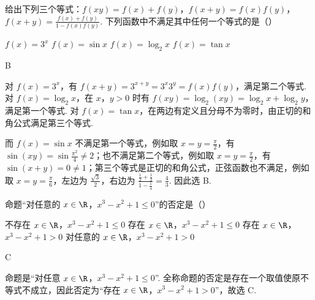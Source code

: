 \begin{problem}
给出下列三个等式：\(f(xy) = f(x) + f(y)\)，\(f(x + y) = f(x)f(y)\)，\(f(x + y) = \frac{f(x) + f(y)}{1 - f(x)f(y)}\). 下列函数中不满足其中任何一个等式的是（\quad）

\choices
    {\(f(x) = 3^{x}\)}
    {\(f(x) = \sin x\)}
    {\(f(x) = \log_2x\)}
    {\(f(x) = \tan x\)}

\begin{answer}B\end{answer}

\begin{solution}
对 \(f(x)=3^x\)，有 \(f(x+y)=3^{x+y}=3^x3^y=f(x)f(y)\)，满足第二个等式. 对 \(f(x)=\log_2x\)，在 \(x\)，\(y>0\) 时有 \(f(xy)=\log_2(xy)=\log_2x+\log_2y\)，满足第一个等式. 对 \(f(x)=\tan x\)，在两边有定义且分母不为零时，由正切的和角公式满足第三个等式.

而 \(f(x)=\sin x\) 不满足第一个等式，例如取 \(x=y=\frac{\pi}{2}\)，有 \(\sin(xy)=\sin\frac{\pi^2}{4}\neq2\)；也不满足第二个等式，例如取 \(x=y=\frac{\pi}{2}\)，有 \(\sin(x+y)=0\neq1\)；第三个等式是正切的和角公式，正弦函数也不满足，例如取 \(x=y=\frac{\pi}{6}\)，左边为 \(\frac{\sqrt{3}}{2}\)，右边为 \(\frac{\frac{1}{2}+\frac{1}{2}}{1-\frac{1}{4}}=\frac{4}{3}\). 因此选 B.
\end{solution}
\end{problem}

\begin{problem}
命题“对任意的 \(x \in \R\)，\(x^3 - x^2 + 1 \leqslant 0\)”的否定是（\quad）

\choices
    {不存在 \(x \in \R\)，\(x^3 - x^2 + 1 \leqslant 0\)}
    {存在 \(x \in \R\)，\(x^3 - x^2 + 1 \leqslant 0\)}
    {存在 \(x \in \R\)，\(x^3 - x^2 + 1 > 0\)}
    {对任意的 \(x \in \R\)，\(x^3 - x^2 + 1 > 0\)}

\begin{answer}C\end{answer}

\begin{solution}
命题是“对任意 \(x\in\R\)，\(x^3-x^2+1\leqslant0\)”. 全称命题的否定是存在一个取值使原不等式不成立，因此否定为“存在 \(x\in\R\)，\(x^3-x^2+1>0\)”，故选 C.
\end{solution}
\end{problem}

